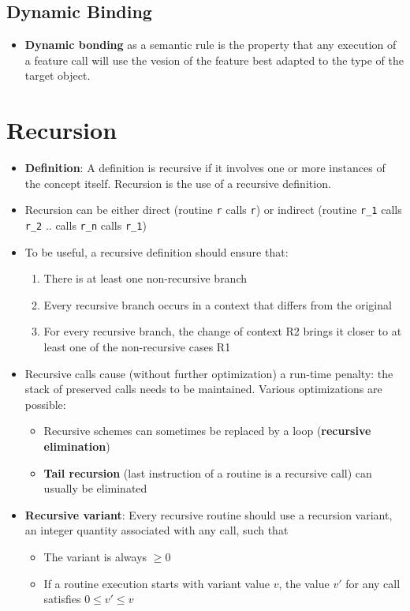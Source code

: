 \documentclass[a4paper]{article}
\newcommand{\inline}[1]{\lstinline!#1!}%
\begin{document}
\subsection{Dynamic Binding}
\begin{itemize}
\item \textbf{Dynamic bonding} as a semantic rule is the property that any execution of a feature call will use the vesion of the feature best adapted to the type of the target object.
\end{itemize}

\section{Recursion}
\begin{itemize}
\item \textbf{Definition}: A definition is recursive if it involves one or more instances of the concept itself. Recursion is the use of a recursive definition. 
\item Recursion can be either direct (routine \inline{r} calls \inline{r}) or indirect (routine \inline{r_1} calls \inline{r_2} .. calls \inline{r_n} calls \inline{r_1})
\item To be useful, a recursive definition should ensure that:
\begin{enumerate}[R1:]
\item There is at least one non-recursive branch
\item Every recursive branch occurs in a context that differs from the original
\item For every recursive branch, the change of context R2 brings it closer to at least one of the non-recursive cases R1
\end{enumerate}
\item Recursive calls cause (without further optimization) a run-time penalty: the stack of preserved calls needs to be maintained. Various optimizations are possible:
\begin{itemize}
\item Recursive schemes can sometimes be replaced by a loop (\textbf{recursive elimination})
\item \textbf{Tail recursion} (last instruction of a routine is a recursive call) can usually be eliminated 
\end{itemize}
\item \textbf{Recursive variant}: Every recursive routine should use a recursion variant, an integer quantity associated with any call, such that
\begin{itemize}
\item The variant is always $\geq 0$
\item If a routine execution starts with variant value $v$, the value $v'$ for any call satisfies $0\leq v'\leq v$
\end{itemize}
\end{itemize}
\end{document}
